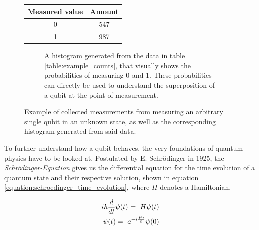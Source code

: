 \begin{figure}[!h]
    \begin{subtable}{.5\textwidth}
    \centering
    \begin{tabular}{|c|c|}
         Measured value & Amount  \\
         \hline
         0 & 547 \\
         1 & 987 \\
    \end{tabular}
    \caption{Table containing all measurements done on a qubit in an unknown superposition. The number of occurrences of a measured 1 or 0 is counted and then used to generate the histogram in figure \ref{figure:example_histogram}}
    \label{table:example_counts}
    \end{subtable}
    \begin{subfigure}{.5\textwidth}
        \centering
        \scalebox{\histogramwidth}{
            
        }
        \caption{A histogram generated from the data in table \ref{table:example_counts}, that visually shows the probabilities of measuring 0 and 1. These probabilities can directly be used to understand the superposition of a qubit at the point of measurement.}
        \label{figure:example_histogram}
    \end{subfigure}
    \caption{Example of collected measurements from measuring an arbitrary single qubit in an unknown state, as well as the corresponding histogram generated from said data.}
    \label{fig:my_label}
\end{figure}

To further understand how a qubit behaves, the very foundations of quantum physics have to be looked at. Postulated by E. Schrödinger in 1925, the \emph{Schrödinger-Equation}\cite{PhysRev.28.1049} gives us the differential equation for the time evolution of a quantum state and their respective solution, shown in equation \ref{equation:schroedinger_time_evolution}, where $H$ denotes a Hamiltonian.

\begin{equation}
    \centering
    \begin{split}
          i\hbar\frac{d}{dt}\psi(t) =\ H\psi(t) \\
        \psi(t) =\ e^{-i\frac{Ht}{\hbar}}\psi(0)
    \end{split}
    \label{equation:schroedinger_time_evolution}
\end{equation}

